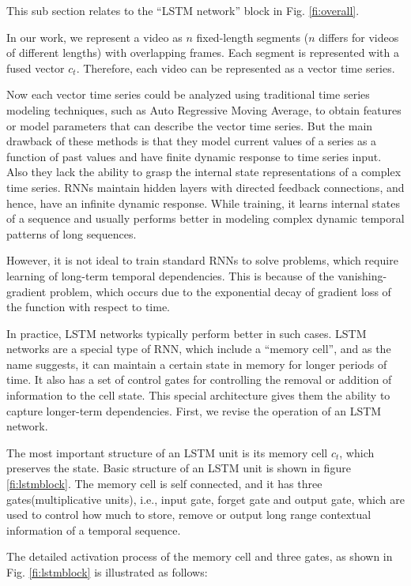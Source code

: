 This sub section relates to
the ``LSTM network'' block in Fig. \ref{fi:overall}.

In our work, we represent a video as $n$
fixed-length segments ($n$ differs for videos of different lengths) with overlapping frames.  Each segment
is represented with a fused vector $c_{t}$. Therefore, each video can be represented as a vector time series.


Now each vector time series could be analyzed using traditional time series modeling techniques,
such as Auto Regressive Moving Average, to obtain features or model parameters that can describe the
vector time series.
But the main drawback of these methods is that they model current values of a series as a function of past values
and have finite dynamic response to time series input. Also they lack the ability to grasp the internal state
representations of a complex time series. RNNs maintain hidden layers with directed feedback connections, and hence,
have an infinite dynamic response. While training, it learns internal states of a sequence
and usually performs better in modeling complex dynamic temporal patterns of long sequences.


However, it is not ideal to train standard RNNs to solve problems, 
which require learning of long-term temporal dependencies. This is because of the vanishing-gradient problem, which occurs
due to the exponential decay of gradient loss of the function with respect to time.

In practice, LSTM networks typically perform better in such cases.
LSTM networks are a special type of RNN, which include a ``memory cell'', and as the name suggests,
it can maintain a certain state in memory for longer periods of time.
It also has a set of control gates for controlling the removal or addition of information to the cell state.
This special architecture gives them the ability to capture longer-term dependencies. First, we revise the operation of an LSTM network.

The most important structure of an LSTM unit is its memory cell $c_{t}$, which preserves the state. Basic structure of an LSTM unit is shown in figure \ref{fi:lstmblock}. The memory cell is self connected, and it has three gates(multiplicative units), i.e., input gate, forget gate and
output gate, which are used to control how much to store, remove or output long range contextual information of a temporal sequence.

The detailed activation process of the memory cell and three gates, as shown in Fig. \ref{fi:lstmblock} is
illustrated as follows:


